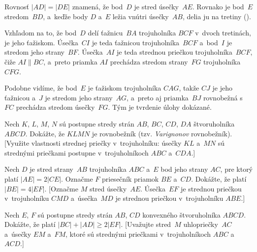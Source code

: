 {%
Rovnosť $|AD|=|DE|$ znamená, že bod~$D$ je stred úsečky~$AE$.
Rovnako je bod~$E$ stredom~$BD$, a~keďže body $D$ a~$E$ ležia vnútri úsečky~$AB$,
delia ju na tretiny (\obr).
%

Vzhľadom na to, že bod~$D$ delí ťažnicu~$BA$ trojuholníka $BCF$ v~dvoch tretinách,
je jeho ťažiskom. Úsečka~$CI$ je teda ťažnicou trojuholníka~$BCF$ a~bod~$I$ je stredom
jeho strany~$BF$. Úsečka~$AI$ je teda strednou priečkou trojuholníka~$BCF$, čiže
$AI\parallel BC$, a~preto priamka $AI$ prechádza stredom strany~$FG$
trojuholníka $CFG$.

Podobne vidíme, že bod~$E$ je ťažiskom trojuholníka $C\!AG$, takže $CJ$ je jeho ťažnicou
a~$J$ je stredom jeho strany~$AG$, a~preto aj priamka~$BJ$ rovnobežná s~$FC$
prechádza stredom úsečky~$FG$. Tým je tvrdenie úlohy dokázané.


Nech $K$, $L$, $M$, $N$ sú postupne stredy strán $AB$,
$BC$, $CD$, $DA$ štvoruholníka $ABCD$. Dokážte, že $KLMN$ je
rovnobežník (tzv. {\it Varignonov\/} rovnobežník).
[Využite vlastnosti strednej priečky v~trojuholníku: úsečky
$KL$ a~$MN$ sú strednými priečkami postupne v~trojuholníkoch $ABC$
a~$CDA$.]

Nech $D$ je stred strany~$AB$ trojuholníka $ABC$ a~$E$ bod
jeho strany $AC$, pre ktorý platí $|AE|=2|CE|$. Označme $F$ priesečník
priamok $BE$ a~$CD$. Dokážte, že platí $|BE|=4|EF|$.
[Označme $M$ stred úsečky~$AE$. Úsečka~$EF$ je strednou priečkou
v~trojuholníku $CMD$ a~úsečka~$MD$ je strednou priečkou
v~trojuholníku $ABE$.]

\D
Nech $E$, $F$ sú postupne stredy strán $AB$, $CD$
konvexného štvoruholníka $ABCD$. Dokážte, že platí $|BC|+|AD|\ge
2|EF|$.
[Uvažujte stred~$M$ uhlopriečky~$AC$ a~úsečky $EM$ a~$FM$,
ktoré sú strednými priečkami v~trojuholníkoch $ABC$ a~$ACD$.]
}

